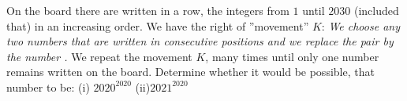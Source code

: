On the board there are written in a row, the integers from $1$ until $2030$ (included that) in an increasing order.
We have the right of  ''movement'' $K$:
\textit{We choose any two numbers  that are written in consecutive positions and we replace the pair  by the number .}
We repeat the movement $K$, many times until only one number remains written on the board. Determine whether it would be possible, that number to be:
(i) $2020^{2020}$  (ii)$2021^{2020}$